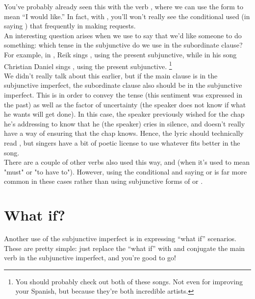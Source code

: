 You've probably already seen this with the verb , where we can use the form  to mean ``I would like.'' In fact, with , you'll won't really see the conditional used (in saying ) that frequently in making requests.
\\

An interesting question arises when we use  to say that we'd like someone to do something: which tense in the subjunctive do we use in the subordinate clause? 
For example, in , Reik sings , using the present subjunctive, while in his song  Christian Daniel sings , using the present subjunctive. \footnote{You should probably check out both of these songs. Not even for improving your Spanish, but because they're both incredible artists.  } \\

We didn't really talk about this earlier, but if the main clause is in the
subjunctive imperfect, the subordinate clause also should be in the subjunctive
imperfect. This is in order to convey the tense (this sentiment was expressed in
the past) as well as the factor of uncertainty (the speaker does not know if
what he wants will get done). In this case, the speaker previously wished for
the chap he's addressing to know that he (the speaker) cries in silence, and
doesn't really have a way of ensuring that the chap knows.  Hence, the lyric
should technically read , but
singers have a bit of poetic license to use whatever fits better in the song.
\\

There are a couple of other verbs also used this way,  and  (when it's used to mean "must" or "to have to"). However, using the conditional and saying  or  is far more common in these cases rather than using subjunctive forms of  or .  \\


\section{What if?}
Another use of the subjunctive imperfect is in expressing ``what if'' scenarios. These are pretty simple: just replace the ``what if'' with  and conjugate the main verb in the subjunctive imperfect, and you're good to go!\\

